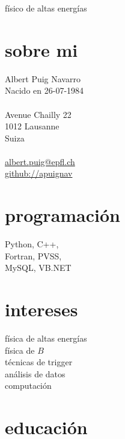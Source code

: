 
\usepackage{xspace}
\def\epfl{\'{E}cole Polytechnique F\'{e}d\'{e}rale de Lausanne\xspace}
\def\myast{\text{\,*}}


       {físico de altas energías}

\begin{aside}
  \section{sobre mi}
    Albert Puig Navarro\\
    Nacido en 26-07-1984\\
    ~\\
    Avenue Chailly 22\\
    1012 Lausanne\\
    Suiza\\
    ~\\
    \href{mailto:albert.puig@epfl.ch}{albert.puig@epfl.ch}\\
    \href{https://github.com/apuignav}{github://apuignav}\\
{  \section{programación}
    Python, C++,\\
    Fortran, PVSS,\\
    MySQL, VB.NET\\
}{}
    \section{intereses}
    física de altas energías\\
    física de $B$\\
    técnicas de trigger\\
    análisis de datos\\
    computación\\

\end{aside}

\section{educación}

